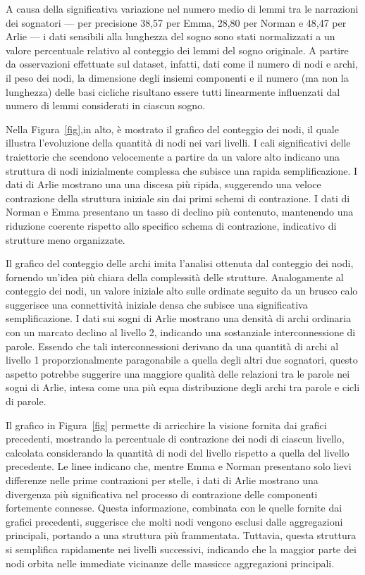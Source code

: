 A causa della significativa variazione nel numero medio di lemmi tra le narrazioni dei sognatori — per precisione 38,57
per Emma, 28,80 per Norman e 48,47 per Arlie — i dati sensibili alla lunghezza del sogno sono stati normalizzati a un
valore percentuale relativo al conteggio dei lemmi del sogno originale.
A partire da osservazioni effettuate sul dataset, infatti, dati come il numero di nodi e archi, il peso dei nodi,
la dimensione degli insiemi componenti e il numero (ma non la lunghezza) delle basi cicliche risultano essere tutti
linearmente influenzati dal numero di lemmi considerati in ciascun sogno.

Nella Figura~\ref{fig},in alto, è mostrato il grafico del conteggio dei nodi, il quale illustra l'evoluzione della
quantità di nodi nei vari livelli.
I cali significativi delle traiettorie che scendono velocemente a partire da un valore alto indicano una struttura
di nodi inizialmente complessa che subisce una rapida semplificazione.
I dati di Arlie mostrano una una discesa più ripida, suggerendo una veloce contrazione della struttura iniziale sin
dai primi schemi di contrazione.
I dati di Norman e Emma presentano un tasso di declino più contenuto, mantenendo una riduzione coerente rispetto
allo specifico schema di contrazione, indicativo di strutture meno organizzate.

Il grafico del conteggio delle archi imita l'analisi ottenuta dal conteggio dei nodi, fornendo un'idea più chiara
della complessità delle strutture.
Analogamente al conteggio dei nodi, un valore iniziale alto sulle ordinate seguito da un brusco calo suggerisce
una connettività iniziale densa che subisce una significativa semplificazione.
I dati sui sogni di Arlie mostrano una densità di archi ordinaria con un marcato declino al livello 2, indicando una
sostanziale interconnessione di parole.
Essendo che tali interconnessioni derivano da una quantità di archi al livello 1 proporzionalmente
paragonabile a quella degli altri due sognatori, questo aspetto potrebbe suggerire una maggiore qualità delle relazioni
tra le parole nei sogni di Arlie, intesa come una più equa distribuzione degli archi tra parole e cicli di parole.

Il grafico in Figura~\ref{fig} permette di arricchire la visione fornita dai grafici precedenti, mostrando la
percentuale di contrazione dei nodi di ciascun livello, calcolata considerando la quantità di nodi del livello
rispetto a quella del livello precedente.
Le linee indicano che, mentre Emma e Norman presentano solo lievi differenze nelle prime contrazioni per stelle, i dati
di Arlie mostrano una divergenza più significativa nel processo di contrazione delle componenti fortemente connesse.
Questa informazione, combinata con le quelle fornite dai grafici precedenti, suggerisce che molti nodi vengono esclusi
dalle aggregazioni principali, portando a una struttura più frammentata.
Tuttavia, questa struttura si semplifica rapidamente nei livelli successivi, indicando che la maggior parte dei nodi
orbita nelle immediate vicinanze delle massicce aggregazioni principali.

